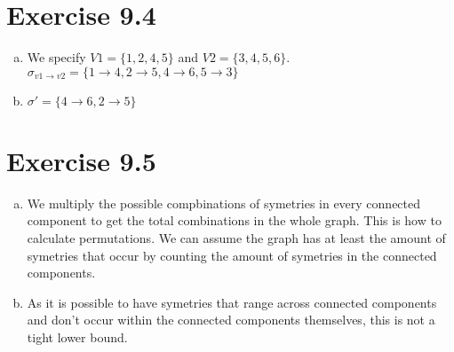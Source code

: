 \documentclass{article} %
\newcommand{\homeworkNumber}{9}
\begin{document}
\section*{Exercise \homeworkNumber.4}
\begin{enumerate}[(a)]
    \item
    We specify $V1 = \{1,2,4,5\}$ and $V2 = \{3,4,5,6\}$. \\
    $\sigma_{v1 \to v2} = \{ 1 \to 4, 2 \to 5, 4 \to 6, 5 \to 3 \}$
    \item 
    $\sigma' = \{ 4 \to 6, 2 \to 5\}$
\end{enumerate}
\section*{Exercise \homeworkNumber.5}
\begin{enumerate}[(a)]
    \item We multiply the possible compbinations of symetries in every connected component to get the total combinations in the whole graph. This is how to calculate permutations. 
    We can assume the graph has at least the amount of symetries that occur by counting the amount of symetries in the connected components.
    \item As it is possible to have symetries that range across connected components and don't occur within the connected components themselves, this is not a tight lower bound.
\end{enumerate}
\end{document}
